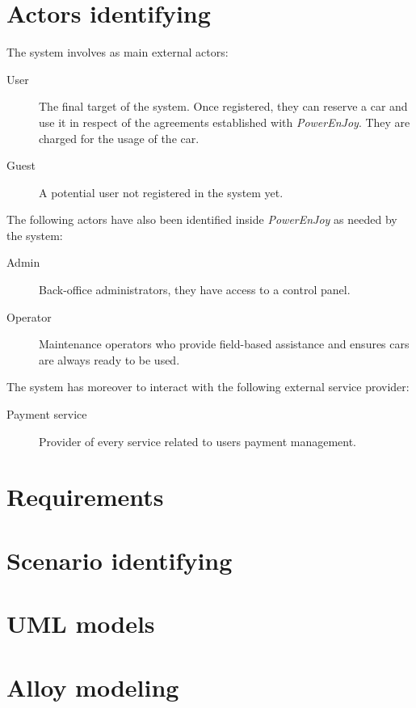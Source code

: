 \documentclass{article}
\begin{document}
	\section{Actors identifying}
		The system involves as main external actors:
		\begin{description}
			\item[User] The final target of the system. Once registered, they can reserve a car and use it in respect of the agreements established with \textit{PowerEnJoy}. They are charged for the usage of the car.

			\item[Guest] A potential user not registered in the system yet.
		\end{description}
		The following actors have also been identified inside \textit{PowerEnJoy} as needed by the system:
		\begin{description}
			\item[Admin] Back-office administrators, they have access to a control panel.

			\item[Operator] Maintenance operators who provide field-based assistance and ensures cars are always ready to be used.

		\end{description}
		The system has moreover to interact with the following external service provider:
		\begin{description}
			\item[Payment service] Provider of every service related to users payment management.
		\end{description}

	\newpage
	\section{Requirements}
	

	\newpage
	\section{Scenario identifying}
	
		

	\newpage
	\section{UML models}
	

	\newpage
	\section{Alloy modeling}
		
\end{document}
